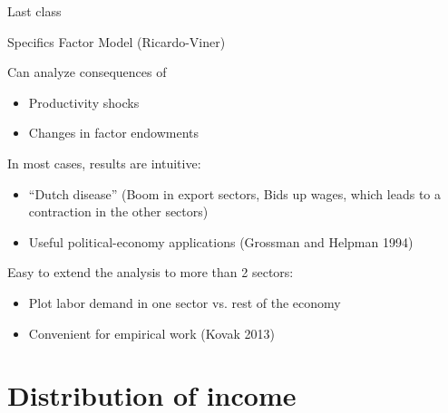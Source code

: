 \documentclass[notes,11pt, aspectratio=169, xcolor=table]{beamer}
\newenvironment{wideitemize}{\itemize\addtolength{\itemsep}{10pt}}{\enditemize}
\begin{document}
\begin{frame}{Last class}
\begin{wideitemize}
    \item Specifics Factor Model (Ricardo-Viner)
    \item Can analyze consequences of
    \begin{itemize}
        \item Productivity shocks
        \item Changes in factor endowments 
    \end{itemize}
    \item In most cases, results are intuitive:
    \begin{itemize}
        \item ``Dutch disease'' (Boom in export sectors, Bids up wages, which leads to a contraction in the other sectors)
        \item Useful political-economy applications (Grossman and Helpman 1994)
    \end{itemize}
    \item Easy to extend the analysis to more than 2 sectors:
    \begin{itemize}
        \item Plot labor demand in one sector vs. rest of the economy
        \item Convenient for empirical work (Kovak 2013) 
    \end{itemize}
    
    \item 
\end{wideitemize}
\end{frame}

\section{Distribution of income}
\end{document}
